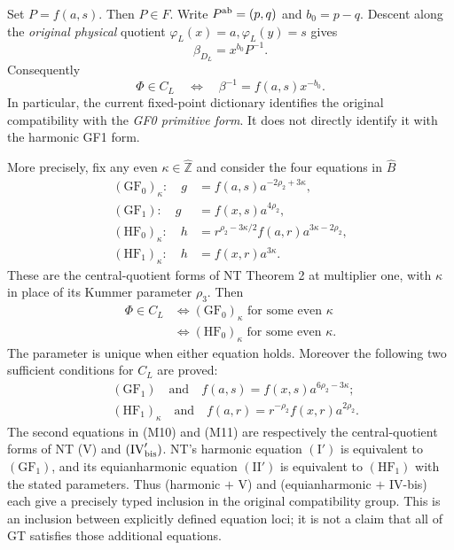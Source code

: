 Set $P=f(a,s)$. Then $P\in F$. Write $P^{\rm ab}=(p,q)$ and
$b_0=p-q$. Descent along the \emph{original physical} quotient
$\varphi_L(x)=a,\varphi_L(y)=s$ gives
\[
 \beta_{D_L}=x^{b_0}P^{-1}.                                     \tag{M6}
\]
Consequently
\[
 \Phi\in C_L\quad\Longleftrightarrow\quad
       \beta^{-1}=f(a,s)x^{-b_0}.                              \tag{M7}
\]
In particular, the current fixed-point dictionary identifies the
original compatibility with the \emph{GF0 primitive form}. It does
not directly identify it with the harmonic GF1 form.

More precisely, fix any even $\kappa\in\widehat{\mathbb Z}$ and consider
the four equations in $\widehat B$
\[
\begin{aligned}
 (\mathrm{GF}_0)_\kappa:\quad
       g&=f(a,s)a^{-2\rho_2+3\kappa},\\
 (\mathrm{GF}_1):\quad
       g&=f(x,s)a^{4\rho_2},\\
 (\mathrm{HF}_0)_\kappa:\quad
       h&=r^{\rho_2-3\kappa/2}f(a,r)a^{3\kappa-2\rho_2},\\
 (\mathrm{HF}_1)_\kappa:\quad
       h&=f(x,r)a^{3\kappa}.
\end{aligned}                                                   \tag{M8}
\]
These are the central-quotient forms of NT Theorem 2 at multiplier
one, with $\kappa$ in place of its Kummer parameter $\rho_3$.
Then
\[
 \begin{split}
 \Phi\in C_L
 &\Longleftrightarrow
   (\mathrm{GF}_0)_\kappa\text{ for some even }\kappa\\
 &\Longleftrightarrow
   (\mathrm{HF}_0)_\kappa\text{ for some even }\kappa.
 \end{split}                                                    \tag{M9}
\]
The parameter is unique when either equation holds. Moreover the
following two sufficient conditions for $C_L$ are proved:
\begin{align}
 &(\mathrm{GF}_1)\quad\text{and}\quad
 f(a,s)=f(x,s)a^{6\rho_2-3\kappa};                              \tag{M10}\\
 &(\mathrm{HF}_1)_\kappa\quad\text{and}\quad
 f(a,r)=r^{-\rho_2}f(x,r)a^{2\rho_2}.                           \tag{M11}
\end{align}
The second equations in (M10) and (M11) are respectively the
central-quotient forms of NT (V) and $(\mathrm{IV}'_{\rm bis})$.
NT's harmonic equation $(\mathrm I')$ is equivalent to
$(\mathrm{GF}_1)$, and its equianharmonic equation $(\mathrm{II}')$
is equivalent to $(\mathrm{HF}_1)$ with the stated parameters.
Thus (harmonic $+$ V) and (equianharmonic $+$ IV-bis) each give a
precisely typed inclusion in the original compatibility group.
This is an inclusion between explicitly defined equation loci;
it is not a claim that all of GT satisfies those additional equations.


